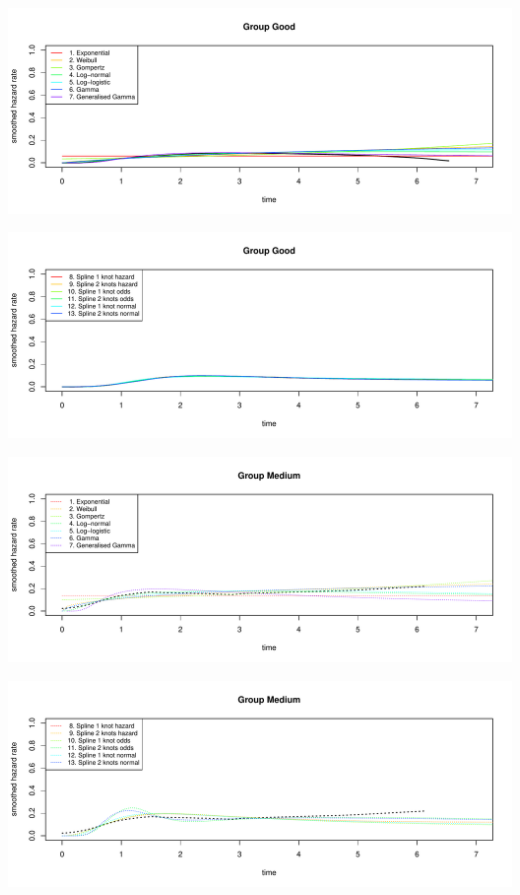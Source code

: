 \documentclass[]{article}
\begin{document}
\begin{flushleft}\includegraphics[height=0.29\textheight]{Images/plot_hr_pred-1} \end{flushleft}

\begin{flushleft}\includegraphics[height=0.29\textheight]{Images/plot_hr_pred-2} \end{flushleft}

\begin{flushleft}\includegraphics[height=0.29\textheight]{Images/plot_hr_pred-3} \end{flushleft}

\begin{flushleft}\includegraphics[height=0.29\textheight]{Images/plot_hr_pred-4} \end{flushleft}
\end{document}
